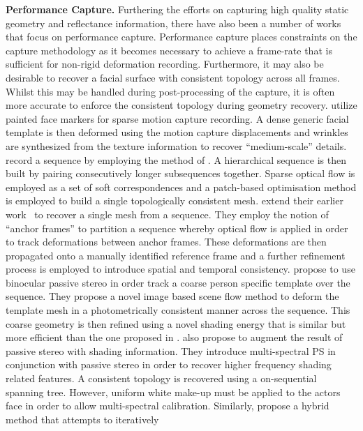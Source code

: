 \textbf{Performance Capture.} Furthering the efforts on capturing high
quality static geometry and reflectance information, there have also been
a number of works that focus on performance capture. Performance capture places
constraints on the capture methodology as it becomes necessary to achieve
a frame-rate that is sufficient for non-rigid deformation recording.
Furthermore, it may also be desirable to recover a facial surface with
consistent topology across all frames. Whilst this may be handled during
post-processing of the capture, it is often more accurate to enforce
the consistent topology during geometry recovery. \citet{bickel2007multi}
utilize painted face markers for sparse motion capture recording. A dense
generic facial template is then deformed using the motion capture displacements
and wrinkles are synthesized from the texture information to recover
``medium-scale'' details. \citet{popa2010globally} record a sequence by
employing the method of \citet{bradley2010high}. A hierarchical sequence
is then built by pairing consecutively longer subsequences together. Sparse
optical flow is employed as a set of soft correspondences and a patch-based
optimisation method is employed to build a single topologically consistent
mesh. \citet{Beeler:2011ey} extend their earlier work~\cite{Beeler:2010dg}
to recover a single mesh from a sequence. They employ the notion
of ``anchor frames'' to partition a sequence whereby optical flow is applied
in order to track deformations between anchor frames. These deformations
are then propagated onto a manually identified reference frame and a further
refinement process is employed to introduce spatial and temporal consistency.
\citet{valgaerts2012lightweight} propose to use binocular passive stereo
in order track a coarse person specific template over the sequence. They
propose a novel image based scene flow method to deform the template
mesh in a photometrically consistent manner across the sequence. This coarse
geometry is then refined using a novel shading energy that is similar
but more efficient than the one proposed in \citet{wu2011high}.
\citet{klaudiny2012high} also propose to augment the result of passive
stereo with shading information. They introduce multi-spectral PS in
conjunction with passive stereo in order to recover higher frequency
shading related features. A consistent topology is recovered using
a on-sequential spanning tree. However, uniform white make-up must be applied
to the actors face in order to allow multi-spectral calibration. Similarly,
\citet{Gotardo:2015vo} propose a hybrid method that attempts to iteratively
